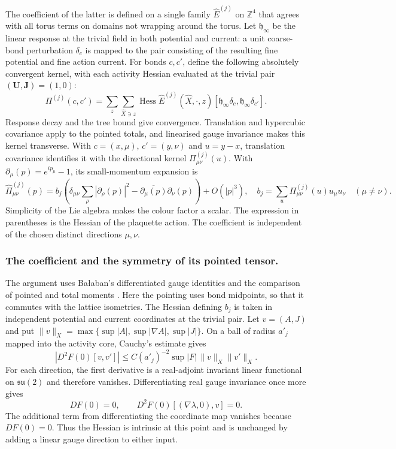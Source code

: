 \documentclass[11pt,letterpaper,reqno]{amsart}
\theoremstyle{definition}
\theoremstyle{remark}
\begin{document}
The coefficient of the latter is defined on a single family
$\widehat E^{(j)}$ on $\mathbb Z^4$ that agrees with all torus
terms on domains not wrapping around the torus. Let
$\mathfrak h_\infty$ be the linear response at the trivial field
in both potential and current: a unit coarse-bond perturbation
$\delta_c$ is mapped to the pair consisting of the resulting fine
potential and fine action current. For bonds $c,c'$, define the
following absolutely convergent kernel, with each activity Hessian
evaluated at the trivial pair $(\mathbf U,\mathbf J)=(1,0)$:
\[
 \Pi^{(j)}(c,c')=
 \sum_z\sum_{\widehat X\ni z}
 \operatorname{Hess}\widehat E^{(j)}(\widehat X,\cdot,z)
 [\mathfrak h_\infty\delta_c,\mathfrak h_\infty\delta_{c'}].
\]
Response decay and the tree bound give convergence. Translation and
hypercubic covariance apply to the pointed totals, and linearised
gauge invariance makes this kernel transverse. With $c=(x,\mu)$,
$c'=(y,\nu)$ and $u=y-x$, translation covariance identifies it with
the directional kernel $\Pi^{(j)}_{\mu\nu}(u)$. With
$\partial_\mu(p)=e^{ip_\mu}-1$, its small-momentum expansion is
\begin{equation}\label{eq:rg-polarisation}
 \widehat\Pi^{(j)}_{\mu\nu}(p)
 =b_j\left(\delta_{\mu\nu}\sum_\rho|\partial_\rho(p)|^2
       -\overline{\partial_\mu(p)}\partial_\nu(p)\right)
 +O(|p|^3),
 \quad
 b_j=\sum_u\Pi^{(j)}_{\mu\nu}(u)u_\mu u_\nu
 \quad(\mu\ne\nu).
\end{equation}
Simplicity of the Lie algebra makes the colour factor a scalar.
The expression in parentheses is the Hessian of the plaquette
action. The coefficient is independent of the chosen distinct
directions $\mu,\nu$.

\subsubsection*{The coefficient and the symmetry of its pointed tensor.}
The argument uses Ba\l aban's differentiated gauge identities
\cite[equations~(4.14)--(4.15), (4.33)]{Balaban1987}
and the comparison of pointed and total moments
\cite[equations~(3.58)--(3.64)]{Balaban1988}.
Here the pointing uses bond midpoints, so that it commutes
with the lattice isometries.
The Hessian defining $b_j$ is taken in independent potential
and current coordinates at the trivial pair. Let
$v=(A,J)$ and put
$\|v\|_X=\max\{\sup|A|,\sup|\nabla A|,\sup|J|\}$.
On a ball of radius $a'_j$ mapped into the activity core,
Cauchy's estimate gives
\[
 |D^2F(0)[v,v']|
        \le C(a'_j)^{-2}\sup|F|\,\|v\|_X\|v'\|_X.
\]
For each direction, the first derivative is a real-adjoint
invariant linear functional on $\mathfrak{su}(2)$ and
therefore vanishes. Differentiating real gauge invariance
once more gives
\[
 DF(0)=0,\qquad
 D^2F(0)[(\nabla\lambda,0),v]=0.
\]
The additional term from differentiating the coordinate
map vanishes because $DF(0)=0$. Thus the Hessian is
intrinsic at this point and is unchanged by adding a
linear gauge direction to either input.
\end{document}
